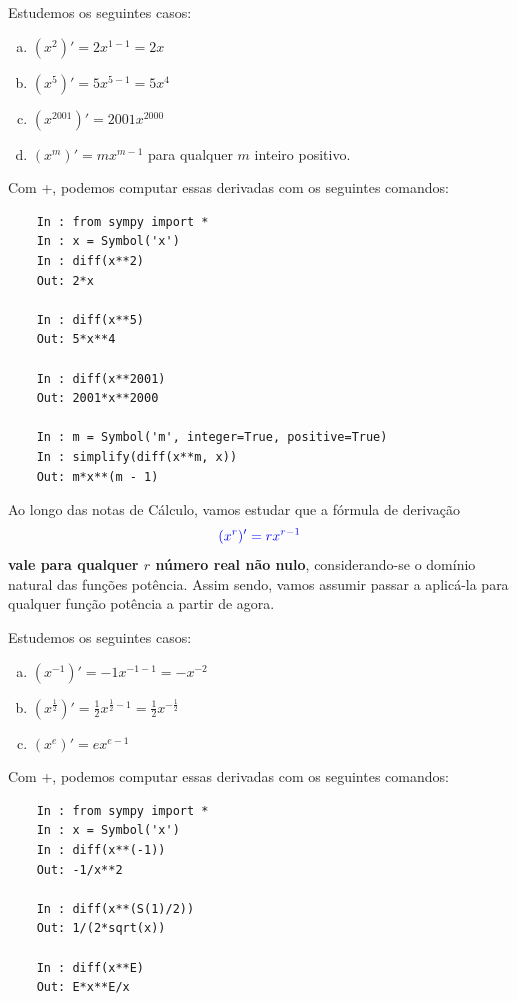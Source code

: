 \begin{ex}
  Estudemos os seguintes casos:
  \begin{enumerate}[a)]
  \item $\left(x^2\right)' = 2x^{1-1} = 2x$
  \item $\left(x^5\right)' = 5x^{5-1} = 5x^4$
  \item $\left(x^{2001}\right)' = 2001x^{2000}$
  \item $\left(x^m\right)' = mx^{m-1}$ para qualquer $m$ inteiro positivo.
  \end{enumerate}
  \ifispython
  Com {\python}+{\sympy}, podemos computar essas derivadas com os seguintes comandos:
  \begin{lstlisting}
    In : from sympy import *
    In : x = Symbol('x')
    In : diff(x**2)
    Out: 2*x

    In : diff(x**5)
    Out: 5*x**4

    In : diff(x**2001)
    Out: 2001*x**2000

    In : m = Symbol('m', integer=True, positive=True)
    In : simplify(diff(x**m, x))
    Out: m*x**(m - 1)
  \end{lstlisting}
  \fi
\end{ex}

\begin{obs}
  Ao longo das notas de Cálculo, vamos estudar que a fórmula de derivação
  \begin{equation}
    {\color{blue}(x^r)'= rx^{r-1}}
  \end{equation}
  {\bf vale para qualquer $r$ número real não nulo}, considerando-se o domínio natural das funções potência. Assim sendo, vamos assumir passar a aplicá-la para qualquer função potência a partir de agora.
\end{obs}

\begin{ex}
  Estudemos os seguintes casos:
  \begin{enumerate}[a)]
  \item $\displaystyle\left(x^{-1}\right)' = -1x^{-1-1} = -x^{-2}$
  \item $\displaystyle\left(x^{\frac{1}{2}}\right)' = \frac{1}{2}x^{\frac{1}{2}-1} = \frac{1}{2}x^{-\frac{1}{2}}$
  \item $\displaystyle\left(x^e\right)' = ex^{e-1}$
  \end{enumerate}
  \ifispython
  Com {\python}+{\sympy}, podemos computar essas derivadas com os seguintes comandos:
  \begin{lstlisting}
    In : from sympy import *
    In : x = Symbol('x')
    In : diff(x**(-1))
    Out: -1/x**2

    In : diff(x**(S(1)/2))
    Out: 1/(2*sqrt(x))

    In : diff(x**E)
    Out: E*x**E/x
  \end{lstlisting}
  \fi  
\end{ex}


